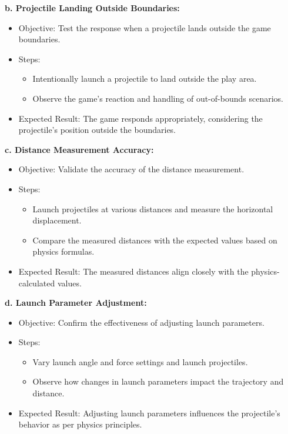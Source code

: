 \documentclass[
]{article}
\begin{document}
\textbf{b. Projectile Landing Outside Boundaries:}

\begin{itemize}
\item
  Objective: Test the response when a projectile lands outside the game
  boundaries.
\item
  Steps:

  \begin{itemize}
  \item
    Intentionally launch a projectile to land outside the play area.
  \item
    Observe the game's reaction and handling of out-of-bounds scenarios.
  \end{itemize}
\item
  Expected Result: The game responds appropriately, considering the
  projectile's position outside the boundaries.
\end{itemize}

\textbf{c. Distance Measurement Accuracy:}

\begin{itemize}
\item
  Objective: Validate the accuracy of the distance measurement.
\item
  Steps:

  \begin{itemize}
  \item
    Launch projectiles at various distances and measure the horizontal
    displacement.
  \item
    Compare the measured distances with the expected values based on
    physics formulas.
  \end{itemize}
\item
  Expected Result: The measured distances align closely with the
  physics-calculated values.
\end{itemize}

\textbf{d. Launch Parameter Adjustment:}

\begin{itemize}
\item
  Objective: Confirm the effectiveness of adjusting launch parameters.
\item
  Steps:

  \begin{itemize}
  \item
    Vary launch angle and force settings and launch projectiles.
  \item
    Observe how changes in launch parameters impact the trajectory and
    distance.
  \end{itemize}
\item
  Expected Result: Adjusting launch parameters influences the
  projectile's behavior as per physics principles.
\end{itemize}
\end{document}
